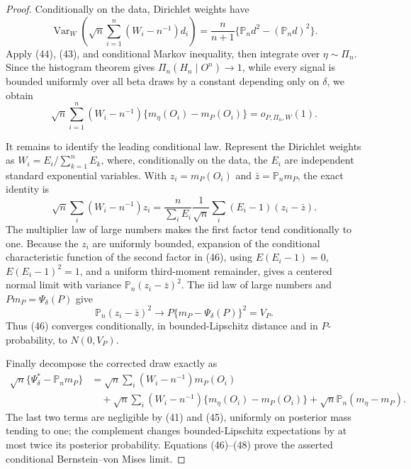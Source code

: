 \documentclass{article}
\begin{document}
\begin{proof}
Conditionally on the data, Dirichlet weights have
\begin{equation}
 \operatorname{Var}_W\!\left(\sqrt n\sum_{i=1}^n(W_i-n^{-1})d_i\right)
 =\frac n{n+1}\{\mathbb P_nd^2-(\mathbb P_nd)^2\}.                                    \tag{44}
\end{equation}
Apply (44), (43), and conditional Markov inequality, then integrate over
\(\eta\sim\Pi_n\).  Since the histogram theorem gives \(\Pi_n(H_n\mid O^n)\to1\), while every signal is bounded uniformly over all beta draws by a constant depending only on \(\delta\), we obtain
\begin{equation}
 \sqrt n\sum_{i=1}^n(W_i-n^{-1})\{m_\eta(O_i)-m_P(O_i)\}=o_{P,\Pi_n,W}(1).             \tag{45}
\end{equation}

It remains to identify the leading conditional law.  Represent the Dirichlet weights as
\(W_i=E_i/\sum_{k=1}^nE_k\), where, conditionally on the data, the \(E_i\) are independent standard exponential variables.  With
\(z_i=m_P(O_i)\) and \(\bar z=\mathbb P_nm_P\), the exact identity is
\begin{equation}
 \sqrt n\sum_i(W_i-n^{-1})z_i
 =\frac{n}{\sum_iE_i}\frac1{\sqrt n}\sum_i(E_i-1)(z_i-\bar z).                         \tag{46}
\end{equation}
The multiplier law of large numbers makes the first factor tend conditionally to one.  Because the \(z_i\) are uniformly bounded, expansion of the conditional characteristic function of the second factor in (46), using
\(E(E_i-1)=0\), \(E(E_i-1)^2=1\), and a uniform third-moment remainder, gives a centered normal limit with variance
\(\mathbb P_n(z_i-\bar z)^2\).  The iid law of large numbers and
\(Pm_P=\Psi_\delta(P)\) give
\begin{equation}
 \mathbb P_n(z_i-\bar z)^2\longrightarrow
 P\{m_P-\Psi_\delta(P)\}^2=V_P.                                                        \tag{47}
\end{equation}
Thus (46) converges conditionally, in bounded-Lipschitz distance and in \(P\)-probability, to \(N(0,V_P)\).

Finally decompose the corrected draw exactly as
\begin{equation}
\begin{aligned}
 \sqrt n\{\Psi_\delta^*-\mathbb P_nm_P\}
 &=\sqrt n\sum_i(W_i-n^{-1})m_P(O_i)\\
 &\quad+\sqrt n\sum_i(W_i-n^{-1})\{m_\eta(O_i)-m_P(O_i)\}
       +\sqrt n\mathbb P_n(m_\eta-m_P).
\end{aligned}                                                                             \tag{48}
\end{equation}
The last two terms are negligible by (41) and (45), uniformly on posterior mass tending to one; the complement changes bounded-Lipschitz expectations by at most twice its posterior probability.  Equations (46)--(48) prove the asserted conditional Bernstein--von Mises limit.


\end{proof}
\end{document}
